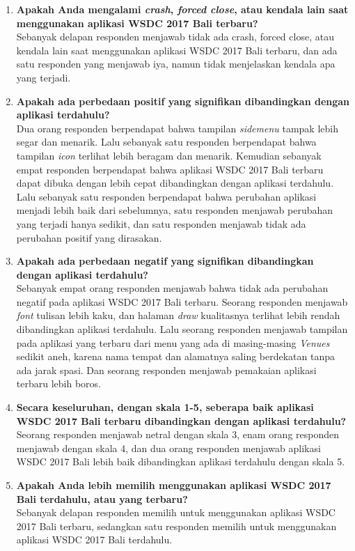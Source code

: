 \begin{enumerate}
	\item \textbf{Apakah Anda mengalami \textit{crash}, \textit{forced close}, atau kendala lain saat menggunakan aplikasi WSDC 2017 Bali terbaru?} \\
	Sebanyak delapan responden menjawab tidak ada crash, forced close, atau kendala lain saat menggunakan aplikasi WSDC 2017 Bali terbaru, dan ada satu responden yang menjawab iya, namun tidak menjelaskan kendala apa yang terjadi.
	\item \textbf{Apakah ada perbedaan positif yang signifikan dibandingkan dengan aplikasi terdahulu?} \\
	Dua orang responden berpendapat bahwa tampilan \textit{sidemenu} tampak lebih segar dan menarik. Lalu sebanyak satu responden berpendapat bahwa tampilan \textit{icon} terlihat lebih beragam dan menarik. Kemudian sebanyak empat responden berpendapat bahwa aplikasi WSDC 2017 Bali terbaru dapat dibuka dengan lebih cepat dibandingkan dengan aplikasi terdahulu. Lalu sebanyak satu responden berpendapat bahwa perubahan aplikasi menjadi lebih baik dari sebelumnya, satu responden menjawab perubahan yang terjadi hanya sedikit, dan satu responden menjawab tidak ada perubahan positif yang dirasakan.
	\item \textbf{Apakah ada perbedaan negatif yang signifikan dibandingkan dengan aplikasi terdahulu?} \\
	Sebanyak empat orang responden menjawab bahwa tidak ada perubahan negatif pada aplikasi WSDC 2017 Bali terbaru. Seorang responden menjawab \textit{font} tulisan lebih kaku, dan halaman \textit{draw} kualitasnya terlihat lebih rendah dibandingkan aplikasi terdahulu. Lalu seorang responden menjawab tampilan pada aplikasi yang terbaru dari menu yang ada di masing-masing \textit{Venues} sedikit aneh, karena nama tempat dan alamatnya saling berdekatan tanpa ada jarak spasi. Dan seorang responden menjawab pemakaian aplikasi terbaru lebih boros.
	\item \textbf{Secara keseluruhan, dengan skala 1-5, seberapa baik aplikasi WSDC 2017 Bali terbaru dibandingkan dengan aplikasi terdahulu?} \\
	Seorang responden menjawab netral dengan skala 3, enam orang responden menjawab dengan skala 4, dan dua orang responden menjawab aplikasi WSDC 2017 Bali lebih baik dibandingkan aplikasi terdahulu dengan skala 5.
	\item \textbf{Apakah Anda lebih memilih menggunakan aplikasi WSDC 2017 Bali terdahulu, atau yang terbaru?} \\
	Sebanyak delapan responden memilih untuk menggunakan aplikasi WSDC 2017 Bali terbaru, sedangkan satu responden memilih untuk menggunakan aplikasi WSDC 2017 Bali terdahulu.

\end{enumerate}
